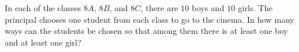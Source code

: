 In each of the classes $8A$, $8B$, and $8C$, there are $10$ boys and $10$ girls. The principal chooses one student from each class to go to the cinema. In how many ways can the students be chosen so that among them there is at least one boy and at least one girl?
